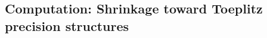 \documentclass[12pt]{article}
\theoremstyle{definition}
\begin{document}
\subsection{Computation: Shrinkage toward Toeplitz precision structures}
\end{document}
